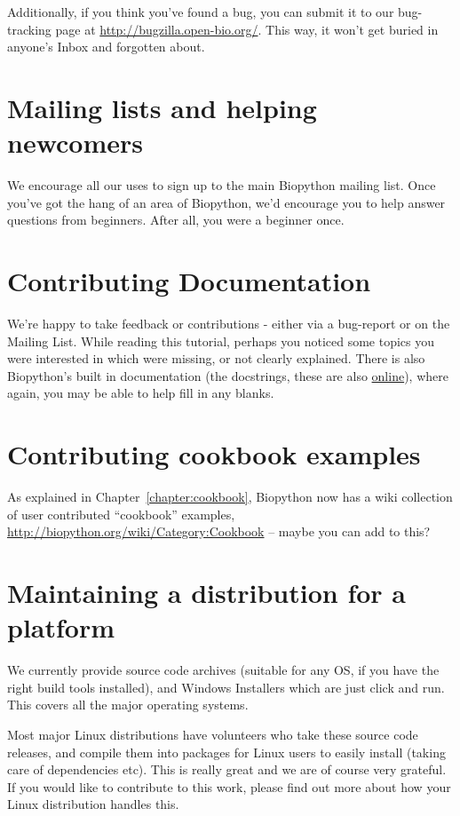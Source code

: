 \documentclass{report}
\begin{document}
Additionally, if you think you've found a bug, you can submit it to our
bug-tracking page at \url{http://bugzilla.open-bio.org/}. This
way, it won't get buried in anyone's Inbox and forgotten about.

\section{Mailing lists and helping newcomers}

We encourage all our uses to sign up to the main Biopython mailing list.
Once you've got the hang of an area of Biopython, we'd encourage you to
help answer questions from beginners.  After all, you were a beginner once.

\section{Contributing Documentation}

We're happy to take feedback or contributions - either via a bug-report or on the Mailing List.
While reading this tutorial, perhaps you noticed some topics you were interested in which were missing, or not clearly explained.  There is also Biopython's built in documentation (the docstrings, these are also 
\href{http://biopython.org/DIST/docs/api}{online}), where again, you may be able to help fill in any blanks.

\section{Contributing cookbook examples}
As explained in Chapter~\ref{chapter:cookbook}, Biopython now has a wiki
collection of user contributed ``cookbook'' examples,
\url{http://biopython.org/wiki/Category:Cookbook} -- maybe you can add
to this?

\section{Maintaining a distribution for a platform}
\label{sec:maintain_dist}

We currently provide source code archives (suitable for any OS, if you have the right build tools installed), and Windows Installers which are just click and run.  This covers all the major operating systems.

Most major Linux distributions have volunteers who take these source code releases, and compile them into packages for Linux users to easily install (taking care of dependencies etc).  This is really great and we are of course very grateful.  If you would like to contribute to this work, please find out more about how your Linux distribution handles this.
\end{document}
